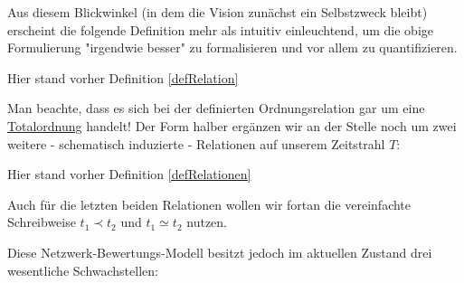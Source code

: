 Aus diesem Blickwinkel (in dem die Vision zunächst ein Selbstzweck bleibt) erscheint die folgende Definition mehr als intuitiv einleuchtend, um die obige Formulierung "irgendwie besser" zu formalisieren und vor allem zu quantifizieren. 



















\vspace{0.3cm}

Hier stand vorher Definition \ref{defRelation}

\vspace{1cm}

Man beachte, dass es sich bei der definierten Ordnungsrelation gar um eine \href{https://de.wikipedia.org/wiki/Ordnungsrelation#Totalordnung}{Totalordnung} handelt!
Der Form halber ergänzen wir an der Stelle noch um zwei weitere - schematisch induzierte - Relationen auf unserem Zeitstrahl $T$:

\vspace{0.3cm}

Hier stand vorher Definition \ref{defRelationen}

\vspace{0.3cm}

Auch für die letzten beiden Relationen wollen wir fortan die vereinfachte Schreibweise $t_1 \prec t_2$ und $t_1 \simeq t_2$ nutzen.
























 

\vspace{1cm}

Diese Netzwerk-Bewertungs-Modell besitzt jedoch im aktuellen Zustand drei wesentliche Schwachstellen:

